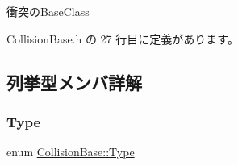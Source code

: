 衝突の\+Base\+Class 

 Collision\+Base.\+h の 27 行目に定義があります。



\subsection{列挙型メンバ詳解}
\mbox{\label{class_collision_base_a18dc0d5461742083ca12013fe9ff1a20}} 
\subsubsection{\texorpdfstring{Type}{Type}}
{\footnotesize\ttfamily enum \mbox{\hyperlink{class_collision_base_a18dc0d5461742083ca12013fe9ff1a20}{Collision\+Base\+::\+Type}}\hspace{0.3cm}{\ttfamily [strong]}}

